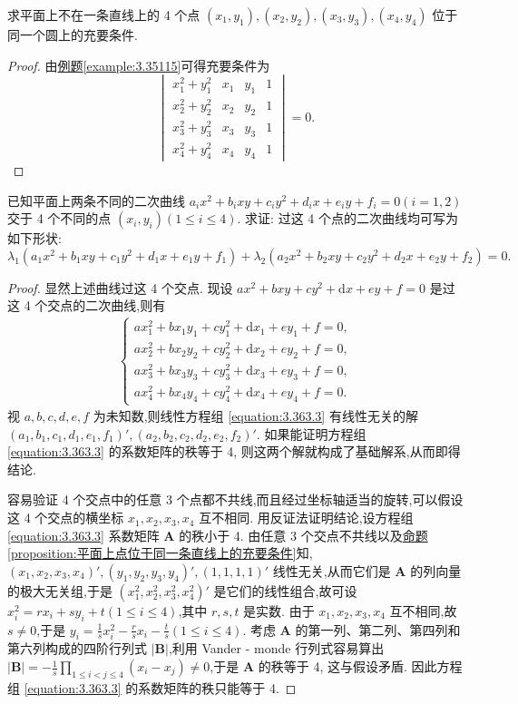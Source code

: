 \documentclass[../../main.tex]{subfiles}
\begin{document}
\begin{proposition}\label{proposition:平面上4点共圆的充要条件}
求平面上不在一条直线上的 4 个点 \((x_1,y_1),(x_2,y_2),(x_3,y_3),(x_4,y_4)\) 位于同一个圆上的充要条件.
\end{proposition}
\begin{proof}
由\hyperref[example:3.35115]{例题\ref{example:3.35115}}可得充要条件为
\[
\begin{vmatrix}
x_1^2 + y_1^2&x_1&y_1&1\\
x_2^2 + y_2^2&x_2&y_2&1\\
x_3^2 + y_3^2&x_3&y_3&1\\
x_4^2 + y_4^2&x_4&y_4&1
\end{vmatrix}=0.
\]
\end{proof}

\begin{example}
已知平面上两条不同的二次曲线 \(a_ix^2 + b_ixy + c_iy^2 + d_ix + e_iy + f_i = 0(i = 1,2)\) 交于 4 个不同的点 \((x_i,y_i)(1\leq i\leq 4)\). 求证: 过这 4 个点的二次曲线均可写为如下形状:
\[
\lambda_1(a_1x^2 + b_1xy + c_1y^2 + d_1x + e_1y + f_1)+\lambda_2(a_2x^2 + b_2xy + c_2y^2 + d_2x + e_2y + f_2)=0.
\]
\end{example}
\begin{proof}
显然上述曲线过这 4 个交点. 现设 \(ax^2 + bxy + cy^2 + \mathrm{d}x + ey + f = 0\) 是过这 4 个交点的二次曲线,则有
\begin{align}\label{equation:3.363.3}
\begin{cases}
ax_1^2 + bx_1y_1 + cy_1^2 + \mathrm{d}x_1 + ey_1 + f = 0,\\
ax_2^2 + bx_2y_2 + cy_2^2 + \mathrm{d}x_2 + ey_2 + f = 0,\\
ax_3^2 + bx_3y_3 + cy_3^2 + \mathrm{d}x_3 + ey_3 + f = 0,\\
ax_4^2 + bx_4y_4 + cy_4^2 + \mathrm{d}x_4 + ey_4 + f = 0.
\end{cases}
\end{align}
视 \(a,b,c,d,e,f\) 为未知数,则线性方程组 \eqref{equation:3.363.3} 有线性无关的解 \((a_1,b_1,c_1,d_1,e_1,f_1)',(a_2,b_2,c_2,d_2,e_2,f_2)'\). 如果能证明方程组 \eqref{equation:3.363.3} 的系数矩阵的秩等于 4, 则这两个解就构成了基础解系,从而即得结论.

容易验证 4 个交点中的任意 3 个点都不共线,而且经过坐标轴适当的旋转,可以假设这 4 个交点的横坐标 \(x_1,x_2,x_3,x_4\) 互不相同. 用反证法证明结论,设方程组 \eqref{equation:3.363.3} 系数矩阵 \(\boldsymbol{A}\) 的秩小于 4. 由任意 3 个交点不共线以及\hyperref[proposition:平面上点位于同一条直线上的充要条件]{命题\ref{proposition:平面上点位于同一条直线上的充要条件}}知,\((x_1,x_2,x_3,x_4)',(y_1,y_2,y_3,y_4)',(1,1,1,1)'\) 线性无关,从而它们是 \(\boldsymbol{A}\) 的列向量的极大无关组,于是 \((x_1^2,x_2^2,x_3^2,x_4^2)'\) 是它们的线性组合,故可设 \(x_i^2 = rx_i + sy_i + t(1\leq i\leq 4)\),其中 \(r,s,t\) 是实数. 由于 \(x_1,x_2,x_3,x_4\) 互不相同,故 \(s\neq 0\),于是 \(y_i = \frac{1}{s}x_i^2 - \frac{r}{s}x_i - \frac{t}{s}(1\leq i\leq 4)\). 考虑 \(\boldsymbol{A}\) 的第一列、第二列、第四列和第六列构成的四阶行列式 \(|\boldsymbol{B}|\),利用 Vander - monde 行列式容易算出 \(|\boldsymbol{B}|=-\frac{1}{s}\prod_{1\leq i < j\leq 4}(x_i - x_j)\neq 0\),于是 \(\boldsymbol{A}\) 的秩等于 4, 这与假设矛盾. 因此方程组 \eqref{equation:3.363.3} 的系数矩阵的秩只能等于 4.
\end{proof}
\end{document}
